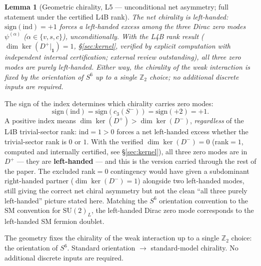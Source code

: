 \documentclass[12pt,a4paper]{article}
\newcommand{\ind}{\mathrm{ind}}
\newcommand{\ZZ}{\mathbb{Z}}
\newtheorem{lemma}{Lemma}[section]
\begin{document}
\begin{lemma}[Geometric chirality, L5 --- unconditional net asymmetry; full statement under the certified L4B rank]\label{lem:chirality}
  The net chirality is left-handed: $\mathrm{sign}(\ind)=+1$ forces a left-handed excess
  among the three Dirac zero modes $\psi^{(\alpha)}$ ($\alpha\in\{v,s,c\}$), unconditionally.
  With the L4B rank result ($\dim\ker(D^+|_{\mathbf 1})=1$, \S\ref{sec:kernel}, verified by
  explicit computation with independent internal certification; external review
  outstanding), all three zero modes are purely left-handed. Either way, the chirality
  of the weak interaction is fixed by the orientation of $S^6$ up to a single $\ZZ_2$
  choice; no additional discrete inputs are required.
\end{lemma}

The sign of the index determines which chirality carries zero modes:
\begin{equation}
  \mathrm{sign}(\ind) = \mathrm{sign}(c_3(S^-)) = \mathrm{sign}(+2) = +1.
\end{equation}
A positive index means $\dim\ker(D^+)>\dim\ker(D^-)$, \emph{regardless} of the L4B
trivial-sector rank: $\ind=1>0$ forces a net left-handed excess whether the trivial-sector
rank is $0$ or $1$. With the verified $\dim\ker(D^-)=0$ (rank$=1$, computed and internally
certified, see \S\ref{sec:kernel}), all three zero modes are in $D^+$ --- they are
\textbf{left-handed} --- and this is the version carried through the rest of the paper.
The excluded rank$=0$ contingency would have given a subdominant right-handed partner
($\dim\ker(D^-)=1$) alongside two left-handed modes,
still giving the correct net chiral asymmetry but not the clean ``all three purely
left-handed'' picture stated here. Matching the $S^6$ orientation
convention to the SM convention for $\mathrm{SU}(2)_L$, the left-handed Dirac zero mode
corresponds to the left-handed SM fermion doublet.

The geometry fixes the chirality of the weak interaction up to a single $\ZZ_2$ choice:
the orientation of $S^6$. Standard orientation $\to$ standard-model chirality. No additional
discrete inputs are required.
\end{document}
